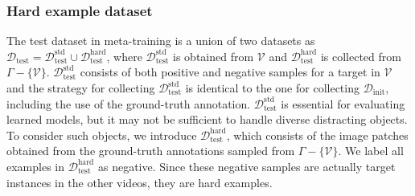 \documentclass[letterpaper]{article} %
\newcommand{\hyeonwoo}[1]{{\color{red}{HW: #1}}}
\newcommand{\ilchae}[1]{{\color{blue}{IC: #1}}}
\def \datainit{\mathcal{D}_\text{init}}
\def \dataval{\mathcal{D}_\text{test}}
\begin{document}
\subsubsection{Hard example dataset}

The test dataset in meta-training is a union of two datasets as $\dataval=\dataval^\text{std}\cup\dataval^\text{hard}$, where $\dataval^\text{std}$ is obtained from $\mathcal{V}$ and $\dataval^\text{hard}$ is collected from $\Gamma-\{\mathcal{V}\}$.
$\dataval^\text{std}$ consists of both positive and negative samples for a target in $\mathcal{V}$ and the strategy for collecting $\dataval^\text{std}$ is identical to the one for collecting $\datainit$, including the use of the ground-truth annotation.
$\dataval^\text{std}$ is essential for evaluating learned models, but it may not be sufficient to handle diverse distracting objects.
To consider such objects, we introduce $\dataval^\text{hard}$, which consists of the image patches obtained from the ground-truth annotations sampled from $\Gamma-\{\mathcal{V}\}$.
We label all examples in $\dataval^\text{hard}$ as negative.
Since these negative samples are actually target instances in the other videos, they are hard examples.

\end{document}

